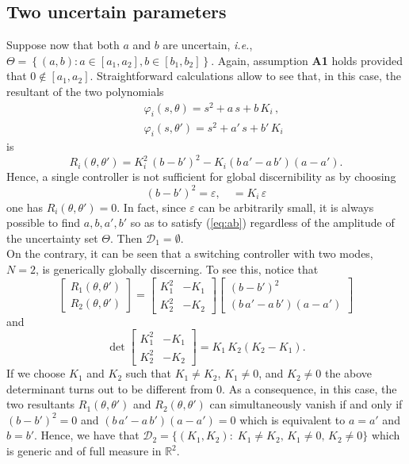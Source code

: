 \documentclass[letterpaper, 10 pt, conference]{ieeetran}
\begin{document}
\subsection{Two uncertain parameters} 
Suppose now that both $a$ and $b$ are uncertain, \emph{i.e.},
$\Theta = \left \{ (a,b): a \in [a_1 , a_2], b \in [b_1 , b_2]  \right \}$. Again, assumption \textbf{A1} holds provided that $0 \notin [a_1 , a_2]$. Straightforward calculations allow to see that, in this case, the resultant of the two polynomials
\begin{eqnarray*}
&& \varphi_i (s,\theta) = s^2 + a \, s + b \, K_i \, , \\
&& \varphi_i (s,\theta') = s^2 + a' \, s + b' \, K_i \
\end{eqnarray*} 
is
\[
R_i (\theta , \theta') = K_i^2 \, (b-b')^2 - K_i (b \, a' - a \, b') (a -a').
\]
Hence, a single controller is not sufficient for global discernibility as by choosing
\begin{equation}\label{eq:ab}
(b-b')^2 = \varepsilon , \quad = K_i  \, \varepsilon
\end{equation}
one has $R_i (\theta , \theta') = 0$. In fact, since $\varepsilon$ can be arbitrarily small, it is always possible to find $a,b,a',b'$ so as to satisfy (\ref{eq:ab}) regardless of the amplitude of the uncertainty set $\Theta$. Then $\mathcal D_1 = \emptyset$. \\
On the contrary, it can be seen that a switching controller with two modes, $N=2$, is generically globally discerning.
To see this, notice that
\[
\left [ \begin{array}{l} R_1 (\theta , \theta') \\  R_2 (\theta , \theta') \end{array} \right ]
= \left [ \begin{array}{ll}  K_1^2 & - K_1 \\ K_2^2 & - K_2 \end{array} \right ] 
\left [ \begin{array}{l} (b-b')^2 \\  (b \, a' - a \, b') (a -a') \end{array} \right ] 
\]
and
\[
\det  \left [ \begin{array}{ll}  K_1^2 & - K_1 \\ K_2^2 & - K_2 \end{array} \right ] = K_1 \, K_2 (K_2 -K_1).
\]
If we choose $K_1$ and $K_2$ such that  $K_1 \ne K_2$, $K_1 \ne 0$, and $K_2 \ne 0$ the above determinant turns out to be
different from $0$. As a consequence, in this case, the two resultants $R_1 (\theta , \theta')$ and $R_2 (\theta , \theta')$ 
can simultaneously vanish if and only if $(b-b')^2 = 0$ and $ (b \, a' - a \, b') (a -a') = 0$ which is equivalent to
$a=a'$ and $b=b'$. Hence, we have that $\mathcal D_2 = \{ (K_1,K_2): \; K_1 \ne K_2, \, K_1 \ne 0, \, K_2 \ne 0 \}$ which is generic and of full measure in $\mathbb R^2$.
\end{document}
